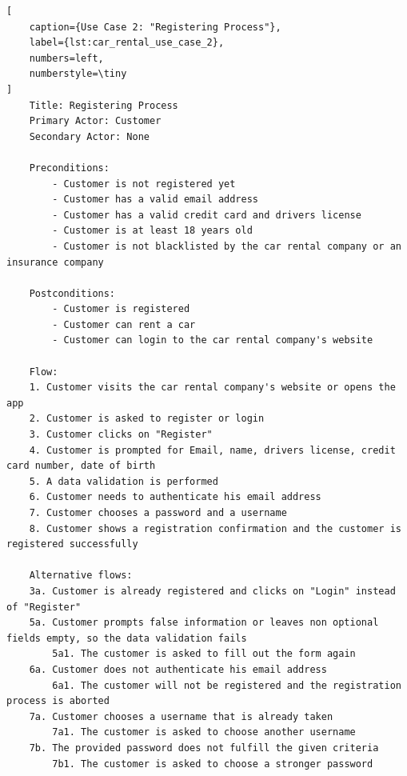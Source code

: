 \begin{lstlisting}[
    caption={Use Case 2: "Registering Process"},
    label={lst:car_rental_use_case_2},
    numbers=left,
    numberstyle=\tiny
]
    Title: Registering Process
    Primary Actor: Customer
    Secondary Actor: None

    Preconditions:
        - Customer is not registered yet
        - Customer has a valid email address
        - Customer has a valid credit card and drivers license
        - Customer is at least 18 years old
        - Customer is not blacklisted by the car rental company or an insurance company

    Postconditions:
        - Customer is registered
        - Customer can rent a car
        - Customer can login to the car rental company's website

    Flow:
    1. Customer visits the car rental company's website or opens the app 
    2. Customer is asked to register or login
    3. Customer clicks on "Register"
    4. Customer is prompted for Email, name, drivers license, credit card number, date of birth
    5. A data validation is performed
    6. Customer needs to authenticate his email address
    7. Customer chooses a password and a username
    8. Customer shows a registration confirmation and the customer is registered successfully 

    Alternative flows:
    3a. Customer is already registered and clicks on "Login" instead of "Register"
    5a. Customer prompts false information or leaves non optional fields empty, so the data validation fails
        5a1. The customer is asked to fill out the form again
    6a. Customer does not authenticate his email address
        6a1. The customer will not be registered and the registration process is aborted
    7a. Customer chooses a username that is already taken
        7a1. The customer is asked to choose another username
    7b. The provided password does not fulfill the given criteria
        7b1. The customer is asked to choose a stronger password
\end{lstlisting}


